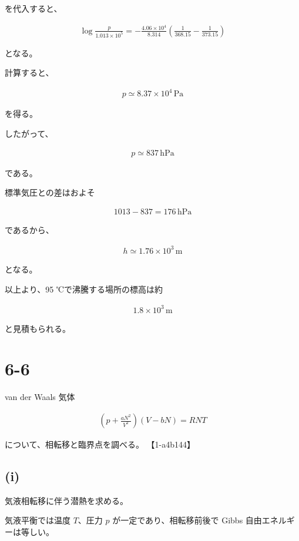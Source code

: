 \documentclass[platex,dvipdfmx,a4paper]{jsarticle}
\begin{document}
を代入すると、

\begin{align*}
\log\frac{p}{1.013\times10^5}
=
-\frac{4.06\times10^4}{8.314}
\left(
\frac1{368.15}
-\frac1{373.15}
\right)
\end{align*}

となる。

計算すると、

\begin{align*}
p
\simeq
8.37\times10^4\,\mathrm{Pa}
\end{align*}

を得る。

したがって、

\begin{align*}
p
\simeq
837\,\mathrm{hPa}
\end{align*}

である。

標準気圧との差はおよそ

\begin{align*}
1013-837
=
176\,\mathrm{hPa}
\end{align*}

であるから、

\begin{align*}
h
\simeq
1.76\times10^3\,\mathrm{m}
\end{align*}

となる。

以上より、95 ℃で沸騰する場所の標高は約

\begin{align*}
1.8\times10^3\,\mathrm{m}
\end{align*}

と見積もられる。
\section{6-6}

van der Waals 気体

\begin{align*}
\left(
p+\frac{aN^2}{V^2}
\right)
(V-bN)
=
RNT
\end{align*}

について、相転移と臨界点を調べる。 【1-a4b144】

\subsection{(i)}

気液相転移に伴う潜熱を求める。

気液平衡では温度 $T$、圧力 $p$ が一定であり、相転移前後で Gibbs 自由エネルギーは等しい。
\end{document}
